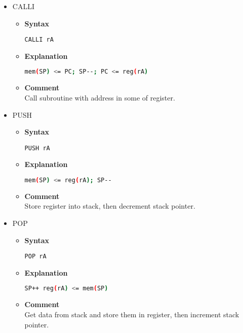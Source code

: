 \begin{itemize}
    \item CALLI
    \begin{itemize}
        \item \textbf{Syntax}
        \begin{lstlisting}[language={[x86masm]Assembler}, frame=single]
    CALLI rA
        \end{lstlisting}
        \item \textbf{Explanation}
        \begin{lstlisting}[language=bash, frame=single]
    mem(SP) <= PC; SP--; PC <= reg(rA)
        \end{lstlisting}
        \item \textbf{Comment} \\
    Call subroutine with address in some of register.
    \end{itemize}

    \item PUSH
    \begin{itemize}
        \item \textbf{Syntax}
        \begin{lstlisting}[language={[x86masm]Assembler}, frame=single]
    PUSH rA
        \end{lstlisting}
        \item \textbf{Explanation}
        \begin{lstlisting}[language=bash, frame=single]
    mem(SP) <= reg(rA); SP--
        \end{lstlisting}
        \item \textbf{Comment} \\
    Store register into stack, then decrement stack pointer.
    \end{itemize}

    \item POP
    \begin{itemize}
        \item \textbf{Syntax}
        \begin{lstlisting}[language={[x86masm]Assembler}, frame=single]
    POP rA
        \end{lstlisting}
        \item \textbf{Explanation}
        \begin{lstlisting}[language=bash, frame=single]
    SP++ reg(rA) <= mem(SP)
        \end{lstlisting}
        \item \textbf{Comment} \\
    Get data from stack and store them in register, then increment stack pointer.
    \end{itemize}


\end{itemize}
